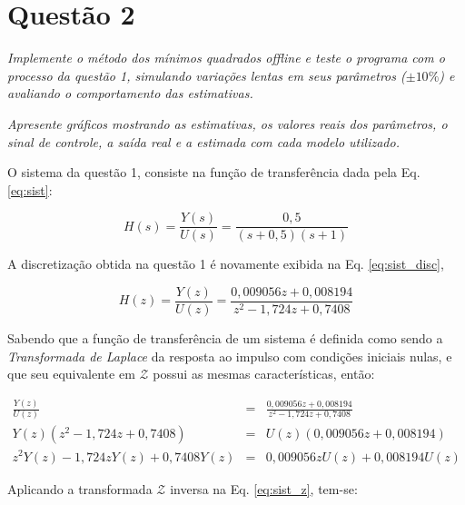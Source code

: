 \chapter*{Questão 2}

{\it Implemente o método dos mínimos quadrados offline e teste o programa com o
processo da questão 1, simulando variações lentas em seus parâmetros ($\pm
10\%$) e avaliando o comportamento das estimativas.}

{\it Apresente gráficos mostrando as estimativas, os valores reais dos
parâmetros, o sinal de controle, a saída real e a estimada com cada modelo
utilizado.}

\vspace{0.5cm}


\vspace{0.25cm}

O sistema da questão 1, consiste na função de transferência dada pela Eq.
\ref{eq:sist}:

\begin{equation}\label{eq:sist}
H(s) = \frac{Y(s)}{U(s)} = \frac{0,5}{(s + 0,5)(s + 1)}
\end{equation}

A discretização obtida na questão 1 é novamente exibida na Eq.
\ref{eq:sist_disc},

\begin{equation}\label{eq:sist_disc}
H(z) = \frac{Y(z)}{U(z)} = \frac{0,009056 z + 0,008194}{z^2 - 1,724 z + 0,7408}
\end{equation}

Sabendo que a função de transferência de um sistema é definida como sendo a {\it
Transformada de Laplace} da resposta ao impulso com condições iniciais nulas, e
que seu equivalente em $\mathcal{Z}$ possui as mesmas características, então:

\begin{eqnarray}
\frac{Y(z)}{U(z)} & = & \frac{0,009056 z + 0,008194}
                             {z^2 - 1,724 z + 0,7408}\nonumber\\
Y(z)(z^2 - 1,724 z + 0,7408) & = & U(z)(0,009056 z + 0,008194)\nonumber\\
z^2Y(z) - 1,724zY(z) + 0,7408Y(z) & = & 0,009056zU(z) +
                                        0,008194U(z)\label{eq:sist_z}
\end{eqnarray}

Aplicando a transformada $\mathcal{Z}$ inversa na Eq. \ref{eq:sist_z}, tem-se:

